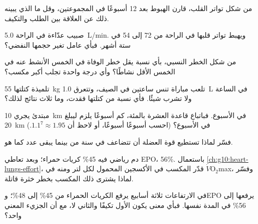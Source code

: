 \begin{exercise}[$\star\star$]\label{exo:g10:sport-and-health:6}
من شكل تواتر القلب، قارن الهبوط بعد 12 أسبوعًا في المجموعتين، وقل ما
الذي يبينه ذلك عن العلاقة بين الطلب والتكيف.
\end{exercise}

\begin{exercise}[$\star\star$]\label{exo:g10:sport-and-health:7}
صبيب عدّاءة في الراحة \qty{5.0}{L/min}. ويهبط تواتر قلبها في الراحة
من 72 إلى 54 في ستة أشهر. فبأي عامل تغير حجمها النفضي؟
\end{exercise}

\begin{exercise}[$\star\star$]\label{exo:g10:sport-and-health:8}
من شكل الخطر النسبي، بأي نسبة يقل خطر الوفاة في الخمس الأنشط عنه في
الخمس الأقل نشاطًا؟ وأي درجة واحدة تجلب أكبر مكسب؟
\end{exercise}

\begin{exercise}[$\star\star$]\label{exo:g10:sport-and-health:9}
تلميذة كتلتها \qty{55}{kg} تلعب مباراة تنس ساعتين في الصيف، وتتعرق
\qty{1.0}{L} في الساعة ولا تشرب شيئًا. فأي نسبة من كتلتها فقدت، وما
ثلاث نتائج لذلك؟
\end{exercise}

\begin{exercise}[$\star\star$]\label{exo:g10:sport-and-health:10}
مبتدئ يجري \qty{10}{km} في الأسبوع. فباتباع قاعدة العشرة بالمئة، كم
أسبوعًا يلزم ليبلغ \qty{20}{km} في الأسبوع؟ (احسب أسبوعًا أسبوعًا، أو
لاحظ أن $1.1^7 \approx 1.95$.)
\end{exercise}

\begin{exercise}[$\star\star$]\label{exo:g10:sport-and-health:11}
فسّر لماذا تستطيع قوة العضلة أن تتضاعف في سنة من  بينما يبقى
عدد  كما هو.
\end{exercise}

\begin{exercise}[$\star\star\star$]\label{exo:g10:sport-and-health:12}
دم رياضي فيه 45\% كريات حمراء؛ وبعد تعاطي EPO، 56\%. باستعمال
\cref{ch:g10:heart-lungs-effort}، قدّر المكسب في الأكسجين المحمول لكل
لتر ومنه في $\dot V\!\mathrm{O_2}$max، وفسّر لماذا يشترى ذلك المكسب
بخطر خثرة قاتلة.
\end{exercise}

\begin{exercise}[$\star\star\star$]\label{exo:g10:sport-and-health:13}
 في الارتفاعات ثلاثة أسابيع يرفع الكريات الحمراء من 45\% إلى
48\%؛ وEPO يرفعها إلى 56\% في المدة نفسها. فبأي معنى يكون الأول تكيفًا
والثاني لا، مع أن الجزيء المعني واحد؟
\end{exercise}

